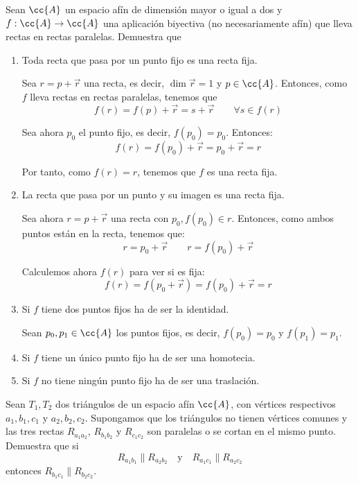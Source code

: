 \begin{ejercicio}
    Sean $\cc{A}$ un espacio afín de dimensión mayor o igual a dos y $f : \cc{A} \to \cc{A}$ una aplicación biyectiva (no necesariamente afín) que lleva rectas en rectas paralelas. Demuestra que
    \begin{enumerate}
        \item Toda recta que pasa por un punto fijo es una recta fija.

        Sea $r=p+\vec{r}$ una recta, es decir, $\dim \vec{r}=1$ y $p\in \cc{A}$. Entonces, como $f$ lleva rectas en rectas paralelas, tenemos que $$f(r)=f(p)+\vec{r}=s+\vec{r} \qquad \forall s\in f(r)$$

        Sea ahora $p_0$ el punto fijo, es decir, $f(p_0)=p_0$. Entonces:
        $$f(r)=f(p_0)+\vec{r}=p_0+\vec{r}=r$$

        Por tanto, como $f(r)=r$, tenemos que $f$ es una recta fija.

        
        \item La recta que pasa por un punto y su imagen es una recta fija.

        Sea ahora $r=p+\vec{r}$ una recta con $p_0,f(p_0)\in r$. Entonces, como ambos puntos están en la recta, tenemos que:
        $$r=p_0+\vec{r} \qquad r=f(p_0)+\vec{r}$$

        Calculemos ahora $f(r)$ para ver si es fija:
        \begin{equation*}
            f(r)=f(p_0+\vec{r})=f(p_0)+\vec{r}=r
        \end{equation*}
        
        \item Si $f$ tiene dos puntos fijos ha de ser la identidad.

        Sean $p_0,p_1\in \cc{A}$ los puntos fijos, es decir, $f(p_0)=p_0$ y $f(p_1)=p_1$.
        
        \item Si $f$ tiene un único punto fijo ha de ser una homotecia.
        \item Si $f$ no tiene ningún punto fijo ha de ser una traslación.
    \end{enumerate}
\end{ejercicio}

\begin{ejercicio}
    Sean $T_1, T_2$ dos triángulos de un espacio afín $\cc{A}$, con vértices respectivos $a_1, b_1, c_1$ y $a_2, b_2, c_2$. Supongamos que los triángulos no tienen vértices comunes y las tres rectas $R_{a_1a_2}$, $R_{b_1b_2}$ y $R_{c_1c_2}$ son paralelas o se cortan en el mismo punto. Demuestra que si
    \begin{equation*}
        R_{a_1b_1} \| R_{a_2b_2}
        \quad \text{y} \quad
        R_{a_1c_1} \| R_{a_2c_2}
    \end{equation*}
    entonces $R_{b_1c_1} \| R_{b_2c_2}$.
\end{ejercicio}

